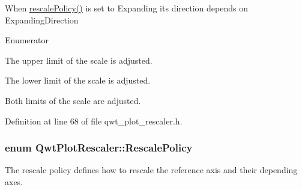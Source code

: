 When \hyperlink{class_qwt_plot_rescaler_adceb6d094c1db33c1ef23e18e1b49185}{rescale\-Policy()} is set to Expanding its direction depends on Expanding\-Direction \begin{Desc}
\item[Enumerator]\par
\begin{description}
\item[{\em 
\hypertarget{class_qwt_plot_rescaler_a1c314e9513cef076a79381111aa67585a10adc202ca84a06179b905db6802668c}{Expand\-Up}\label{class_qwt_plot_rescaler_a1c314e9513cef076a79381111aa67585a10adc202ca84a06179b905db6802668c}
}]The upper limit of the scale is adjusted. \item[{\em 
\hypertarget{class_qwt_plot_rescaler_a1c314e9513cef076a79381111aa67585a856d9a1fe75ed6398a1b3c4b60f3fbfd}{Expand\-Down}\label{class_qwt_plot_rescaler_a1c314e9513cef076a79381111aa67585a856d9a1fe75ed6398a1b3c4b60f3fbfd}
}]The lower limit of the scale is adjusted. \item[{\em 
\hypertarget{class_qwt_plot_rescaler_a1c314e9513cef076a79381111aa67585a3dfb8208dfb62200761e4221763db033}{Expand\-Both}\label{class_qwt_plot_rescaler_a1c314e9513cef076a79381111aa67585a3dfb8208dfb62200761e4221763db033}
}]Both limits of the scale are adjusted. \end{description}
\end{Desc}


Definition at line 68 of file qwt\-\_\-plot\-\_\-rescaler.\-h.

\hypertarget{class_qwt_plot_rescaler_a6a614b832876a7641cb5410ba81d9d6a}{
\subsubsection[{Rescale\-Policy}]{\setlength{\rightskip}{0pt plus 5cm}enum {\bf Qwt\-Plot\-Rescaler\-::\-Rescale\-Policy}}}\label{class_qwt_plot_rescaler_a6a614b832876a7641cb5410ba81d9d6a}
The rescale policy defines how to rescale the reference axis and their depending axes.

